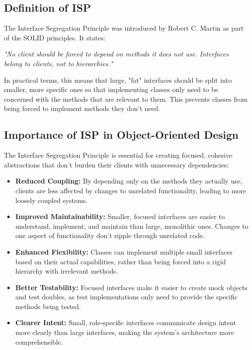 \subsection{Definition of ISP}

The Interface Segregation Principle was introduced by Robert C. Martin as part of the SOLID principles. It states:

\textit{"No client should be forced to depend on methods it does not use. Interfaces belong to clients, not to hierarchies."}

In practical terms, this means that large, "fat" interfaces should be split into smaller, more specific ones so that implementing classes only need to be concerned with the methods that are relevant to them. This prevents classes from being forced to implement methods they don't need.

\subsection{Importance of ISP in Object-Oriented Design}

The Interface Segregation Principle is essential for creating focused, cohesive abstractions that don't burden their clients with unnecessary dependencies:

\begin{itemize}
    \item \textbf{Reduced Coupling:} By depending only on the methods they actually use, clients are less affected by changes to unrelated functionality, leading to more loosely coupled systems.
    
    \item \textbf{Improved Maintainability:} Smaller, focused interfaces are easier to understand, implement, and maintain than large, monolithic ones. Changes to one aspect of functionality don't ripple through unrelated code.
    
    \item \textbf{Enhanced Flexibility:} Classes can implement multiple small interfaces based on their actual capabilities, rather than being forced into a rigid hierarchy with irrelevant methods.
    
    \item \textbf{Better Testability:} Focused interfaces make it easier to create mock objects and test doubles, as test implementations only need to provide the specific methods being tested.
    
    \item \textbf{Clearer Intent:} Small, role-specific interfaces communicate design intent more clearly than large interfaces, making the system's architecture more comprehensible.
\end{itemize}

